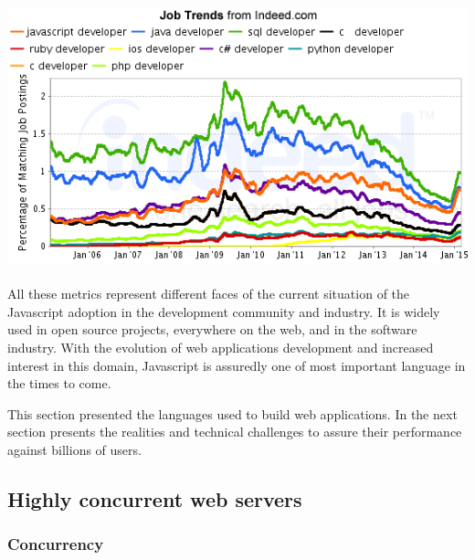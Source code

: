 \includegraphics[width=0.9\linewidth]{../../data/js-trends/jobgraph}

\paragraph{}

All these metrics represent different faces of the current situation of the Javascript adoption in the development community and industry.
It is widely used in open source projects, everywhere on the web, and in the software industry.
With the evolution of web applications development and increased interest in this domain, Javascript is assuredly one of most important language in the times to come.

This section presented the languages used to build web applications.
In the next section presents the realities and technical challenges to assure their performance against billions of users.



\subsection{Highly concurrent web servers}



\subsubsection{Concurrency}

